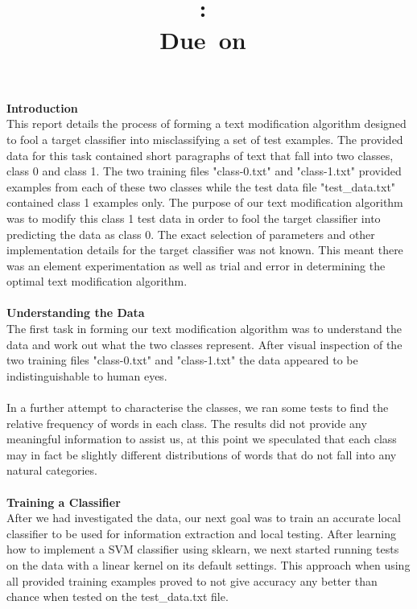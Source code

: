 \documentclass{article}
\title{
\vspace{3.5in}
\textmd{\textbf{\hmwkSubject}}\\
\textmd{\textbf{\hmwkClass:\ \hmwkTitle}}\\
\normalsize\vspace{0.1in}\small{Due\ on\ \hmwkDueDate}\\
\vspace{3.5in}
}
\author{\textbf{\hmwkAuthorName}}
\date{} %
\begin{document}
\maketitle

\textbf{\large Introduction} \\
This report details the process of forming a text modification algorithm designed to fool a target classifier into misclassifying a set of test examples. The provided data for this task contained short paragraphs of text that fall into two classes, class 0 and class 1. The two training files "class-0.txt" and "class-1.txt" provided examples from each of these two classes while the test data file "test\_data.txt" contained class 1 examples only. The purpose of our text modification algorithm was to modify this class 1 test data in order to fool the target classifier into predicting the data as class 0. The exact selection of parameters and other implementation details for the target classifier was not known. This meant there was an element experimentation as well as trial and error in determining the optimal text modification algorithm. \\ \\
\textbf{\large Understanding the Data} \\
The first task in forming our text modification algorithm was to understand the data and work out what the two classes represent. After visual inspection of the two training files "class-0.txt" and "class-1.txt" the data appeared to be indistinguishable to human eyes. \\ \\
In a further attempt to characterise the classes, we ran some tests to find the relative frequency of words in each class. The results did not provide any meaningful information to assist us, at this point we speculated that each class may in fact be slightly different distributions of words that do not fall into any natural categories. \\ \\
\textbf{\large Training a Classifier} \\
After we had investigated the data, our next goal was to train an accurate local classifier to be used for information extraction and local testing. After learning how to implement a SVM classifier using sklearn, we next started running tests on the data with a linear kernel on its default settings. This approach when using all provided training examples proved to not give accuracy any better than chance when tested on the test\_data.txt file. \\ \\
\end{document}
